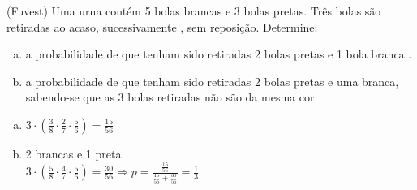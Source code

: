 \begin{ex}
 	(Fuvest) Uma urna contém 5 bolas brancas e 3 bolas pretas. Três bolas são retiradas ao acaso, sucessivamente , sem reposição. Determine:
    \begin{enumerate}[(a)]
    \item  a probabilidade de que tenham sido retiradas 2 bolas pretas e 1 bola branca .
    \item  a probabilidade de que tenham sido retiradas 2 bolas pretas e uma branca, sabendo-se que as 3 bolas retiradas não são da mesma cor.
    \end{enumerate}
      \begin{sol}
        \phantom{A} 
          \begin{enumerate} [(a)]
              \item  $3\cdot(\frac{3}{8}\cdot\frac{2}{7}\cdot\frac{5}{6})=\frac{15}{56}$
              \item 2 brancas e 1 preta  \\
              $3\cdot(\frac{5}{8}\cdot\frac{4}{7}\cdot\frac{5}{6})=\frac{30}{56} \Longrightarrow p= \frac{\frac{15}{56}}{\frac{15}{56}+\frac{30}{56}}=\frac{1}{3}$
              
          \end{enumerate}
      \end{sol}
\end{ex}